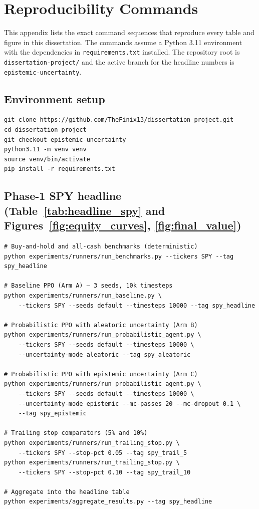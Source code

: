 \chapter{Reproducibility Commands}
\label{app:reproducibility}

This appendix lists the exact command sequences that reproduce every table and figure in this dissertation. The commands assume a Python 3.11 environment with the dependencies in \texttt{requirements.txt} installed. The repository root is \texttt{dissertation-project/} and the active branch for the headline numbers is \texttt{epistemic-uncertainty}.

\section{Environment setup}
\label{app:env_setup}

\begin{verbatim}
git clone https://github.com/TheFinix13/dissertation-project.git
cd dissertation-project
git checkout epistemic-uncertainty
python3.11 -m venv venv
source venv/bin/activate
pip install -r requirements.txt
\end{verbatim}

\section{Phase-1 SPY headline (Table~\ref{tab:headline_spy} and Figures~\ref{fig:equity_curves}, \ref{fig:final_value})}
\label{app:phase1_spy}

\begin{verbatim}
# Buy-and-hold and all-cash benchmarks (deterministic)
python experiments/runners/run_benchmarks.py --tickers SPY --tag spy_headline

# Baseline PPO (Arm A) — 3 seeds, 10k timesteps
python experiments/runners/run_baseline.py \
    --tickers SPY --seeds default --timesteps 10000 --tag spy_headline

# Probabilistic PPO with aleatoric uncertainty (Arm B)
python experiments/runners/run_probabilistic_agent.py \
    --tickers SPY --seeds default --timesteps 10000 \
    --uncertainty-mode aleatoric --tag spy_aleatoric

# Probabilistic PPO with epistemic uncertainty (Arm C)
python experiments/runners/run_probabilistic_agent.py \
    --tickers SPY --seeds default --timesteps 10000 \
    --uncertainty-mode epistemic --mc-passes 20 --mc-dropout 0.1 \
    --tag spy_epistemic

# Trailing stop comparators (5% and 10%)
python experiments/runners/run_trailing_stop.py \
    --tickers SPY --stop-pct 0.05 --tag spy_trail_5
python experiments/runners/run_trailing_stop.py \
    --tickers SPY --stop-pct 0.10 --tag spy_trail_10

# Aggregate into the headline table
python experiments/aggregate_results.py --tag spy_headline
\end{verbatim}

